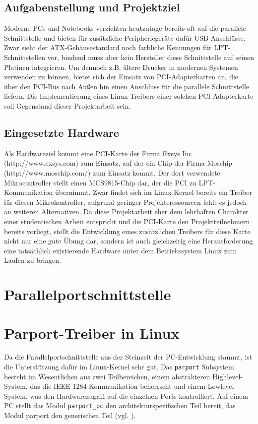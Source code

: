 \documentclass[a4paper,11pt]{article}
\begin{document}
 
\subsection{Aufgabenstellung und Projektziel}

Moderne PCs und Notebooks verzichten heutzutage bereits oft auf die parallele Schnittstelle und bieten für zusätzliche Peripheriegeräte dafür USB-Anschlüsse. Zwar sieht der ATX-Gehäusestandard noch farbliche Kennungen für LPT-Schnittstellen vor, bindend muss aber kein Hersteller diese Schnittstelle auf seinen Platinen integrieren. Um dennoch z.B. ältere Drucker in modernen Systemen verwenden zu können, bietet sich der Einsatz von PCI-Adapterkarten an, die über den PCI-Bus nach Außen hin einen Anschluss für die parallele Schnittstelle liefern. Die Implementierung eines Linux-Treibers einer solchen PCI-Adapterkarte soll Gegenstand dieser Projektarbeit sein. 

\subsection{Eingesetzte Hardware}  

Als Hardwareziel kommt eine PCI-Karte der Firma Exsys Inc (http://www.exsys.com) zum Einsatz, auf der ein Chip der Firma Moschip (http://www.moschip.com/) zum Einsatz kommt. Der dort verwendete Mikrocontroller stellt einen MCS9815-Chip dar, der die PCI zu LPT-Kommunikation übernimmt. Zwar findet sich im Linux-Kernel bereits ein Treiber für diesen Mikrokontroller, aufgrund geringer Projekteressourcen fehlt es jedoch an weiteren Alternativen. Da diese Projektarbeit eher dem lehrhaften Charakter einer studentischen Arbeit entspricht und die PCI-Karte den Projektteilnehmern bereits vorliegt, stellt die Entwicklung eines zusätzlichen Treibers für diese Karte nicht nur eine gute Übung dar, sondern ist auch gleichzeitig eine Herausforderung eine tatsächlich existierende Hardware unter dem Betriebssystem Linux zum Laufen zu bringen.  

\section{Parallelportschnittstelle}

\section{Parport-Treiber in Linux}

Da die Parallelportschnittstelle aus der Steinzeit der PC-Entwicklung stammt, ist die Unterstützung
dafür im Linux-Kernel sehr gut. 
Das \verb|parport| Subsystem besteht im Wesentlichen aus zwei Teilbereichen, einem abstrakteren Highlevel-System, das
die IEEE 1284 Kommunikation beherrscht und einem Lowlevel-System, was den Hardwarezugriff auf die einzelnen Ports
kontrolliert. Auf einem PC stellt das Modul \verb|parport_pc| den architekturspezifischen Teil bereit, das Modul parport 
den generischen Teil (vgl. \cite{net:1}).
\end{document}

